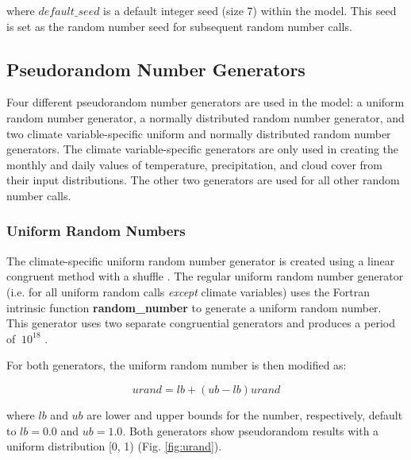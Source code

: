 \documentclass[a4paper, 12pt] {report}
\begin{document}
where $default\_seed$ is a default integer seed (size 7) within the model. This seed is set as the random number seed for subsequent random number calls.

\subsection{Pseudorandom Number Generators}

Four different pseudorandom number generators are used in the model: a uniform random number generator, a normally distributed random number generator, and two climate variable-specific uniform and normally distributed random number generators. The climate variable-specific generators are only used in creating the monthly and daily values of temperature, precipitation, and cloud cover from their input distributions. The other two generators are used for all other random number calls.

\subsubsection{Uniform Random Numbers}

The climate-specific uniform random number generator is created using a linear congruent method with a shuffle . The regular uniform random number generator (i.e. for all uniform random calls \textit{except} climate variables) uses the Fortran intrinsic function \textbf{random\_number} to generate a uniform random number. This generator uses two separate congruential generators and produces a period of $~10^{18}$ .

For both generators, the uniform random number is then modified as:

\begin{equation} 
urand = lb + (ub - lb)urand
\end{equation}

where $lb$ and $ub$ are lower and upper bounds for the number, respectively, default to $lb = 0.0$ and $ub = 1.0$. Both generators show pseudorandom results with a uniform distribution [0, 1) (Fig. \ref{fig:urand}).
\end{document}
